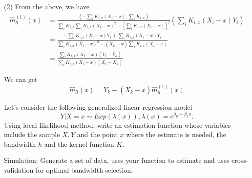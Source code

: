 \begin{solution}
    (2) From the above, we have 
    \begin{equation}
        \begin{aligned} 
            \hat{m}_{ll}^{(1)}(x) 
            &=\frac{\left(-\sum_{i} K_{i, x}\left(X_{i}-x\right), \sum_{i} K_{i, x}\right)}{\sum_{i} K_{i, x} \sum_{i} K_{i, x}\left(X_{i}-x\right)^{2}-\left[\sum_{i} K_{i, x}\left(X_{i}-x\right)\right]^{2}}\left(\sum_{i} K_{i, x}\left(X_{i}-x\right) Y_{i}\right) \\ 
            &=\frac{-\sum_{i} K_{i, x}\left(X_{i}-x\right) \bar{Y}_{k}+\sum_{i} K_{i, x}\left(X_{i}-x\right) Y_{i}}{\sum_{i} K_{i, x}\left(X_{i}-x\right)^{2}-\left(\bar{X}_{k}-x\right) \sum_{i} K_{i, x}\left(X_{i}-x\right)} \\ 
            &=\frac{\sum_{i} K_{i, x}\left(X_{i}-x\right)\left(Y_{i}-\bar{Y}_{k}\right)}{\sum_{i} K_{i, x}\left(X_{i}-x\right)\left(X_{i}-\bar{X}_{k}\right)} 
        \end{aligned}
    \end{equation}
    
    We can get
    \begin{equation}
        \hat{m}_{ll}(x)=\bar{Y}_{k}-\left(\bar{X}_{k}-x\right) \hat{m}_{l l}^{(1)}(x)
    \end{equation}
\end{solution}


\begin{problem}[HW 14.2]
    Let's consider the following generalized linear regression model
    \begin{equation*}
        Y|X=x\sim Exp(\lambda(x)), \lambda(x)=e^{\beta_0+\beta_1x}.
    \end{equation*}
    Using local likelihood method, write an estimation function whose variables include the sample $X, Y$ and the point $x$ where the estimate is needed, the bandwidth $h$ and the kernel function $K$. 
    
    Simulation: Generate a set of data, uses your function to estimate and uses cross-validation for optimal bandwidth selection. 
\end{problem}